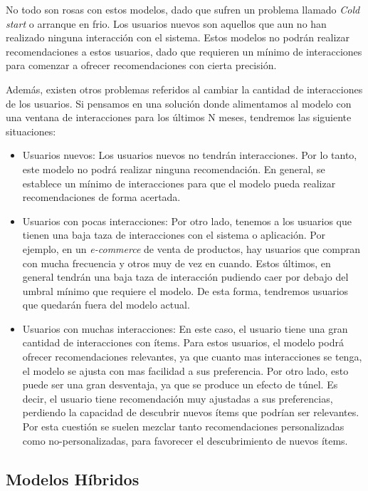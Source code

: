 \documentclass[11pt,a4paper,twoside]{thesis}
\begin{document}
No todo son rosas con estos modelos, dado que sufren un problema llamado
\textit{Cold start} o arranque en frio. Los usuarios nuevos son aquellos que
aun no han realizado ninguna interacción con el sistema. Estos modelos no
podrán realizar recomendaciones a estos usuarios, dado que requieren un mínimo
de interacciones para comenzar a ofrecer recomendaciones con cierta precisión.

Además, existen otros problemas referidos al cambiar la cantidad de
interacciones de los usuarios. Si pensamos en una solución donde alimentamos al
modelo con una ventana de interacciones para los últimos N meses, tendremos las
siguiente situaciones:

\begin{itemize}
	\item Usuarios nuevos: Los usuarios nuevos no tendrán interacciones. Por lo tanto,
	      este modelo no podrá realizar ninguna recomendación. En general, se establece
	      un mínimo de interacciones para que el modelo pueda realizar recomendaciones de
	      forma acertada.
	\item Usuarios con pocas interacciones: Por otro lado, tenemos a los usuarios que
	      tienen una baja taza de interacciones con el sistema o aplicación. Por ejemplo,
	      en un \textit{e-commerce} de venta de productos, hay usuarios que compran con
	      mucha frecuencia y otros muy de vez en cuando. Estos últimos, en general
	      tendrán una baja taza de interacción pudiendo caer por debajo del umbral mínimo
	      que requiere el modelo. De esta forma, tendremos usuarios que quedarán fuera
	      del modelo actual.
	\item Usuarios con muchas interacciones: En este caso, el usuario tiene una gran
	      cantidad de interacciones con ítems. Para estos usuarios, el modelo podrá
	      ofrecer recomendaciones relevantes, ya que cuanto mas interacciones se tenga,
	      el modelo se ajusta con mas facilidad a sus preferencia. Por otro lado, esto
	      puede ser una gran desventaja, ya que se produce un efecto de túnel. Es decir,
	      el usuario tiene recomendación muy ajustadas a sus preferencias, perdiendo la
	      capacidad de descubrir nuevos ítems que podrían ser relevantes. Por esta
	      cuestión se suelen mezclar tanto recomendaciones personalizadas como
	      no-personalizadas, para favorecer el descubrimiento de nuevos ítems.

\end{itemize}

\clearpage
\subsection{Modelos Híbridos}
\end{document}
